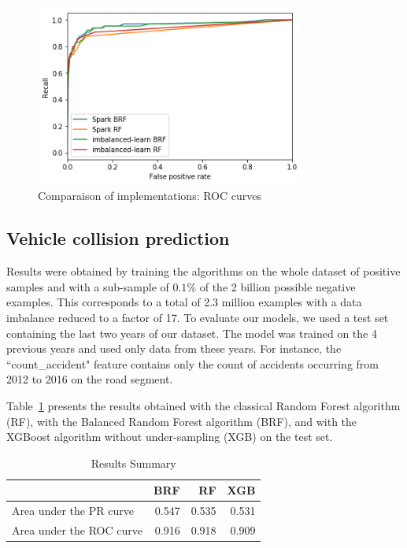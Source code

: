 \documentclass[conference]{IEEEtran}
\begin{document}
\begin{figure}[htbp]
\centerline{\includegraphics[height=6cm, keepaspectratio]{figures/test_brf_roc.png}}
\caption{Comparaison of implementations: ROC curves}
\label{fig:test-brf-roc}
\end{figure}

\subsection{Vehicle collision prediction}

Results were obtained by training the algorithms on the whole
dataset of positive samples and with a sub-sample of $0.1\%$ of the 2
billion possible negative examples. This corresponds to a total of 2.3
million examples with a data imbalance reduced to a factor of 17. To
evaluate our models, we used a test set containing the last two years of our
dataset. The model was trained on the 4 previous years and used only data
from these years. For instance, the ``count\_accident" feature contains only
the count of accidents occurring from 2012 to 2016 on the road segment.

Table~\ref{table:summary} presents the results obtained with the classical
Random Forest algorithm (RF), with the Balanced Random Forest algorithm (BRF), and with the XGBoost algorithm without under-sampling (XGB) on the test set.

\begin{table}[htbp]
\caption{Results Summary}
\begin{center}
\begin{tabular}{|l|r|r|r|}
\hline
                 &    BRF &    RF &    XGB \\
\hline
Area under the PR curve &  0.547 &  0.535 &  0.531 \\
Area under the ROC curve &  0.916 &  0.918 &  0.909 \\
\hline
\end{tabular}
\label{table:summary}
\end{center}
\end{table}
\end{document}
